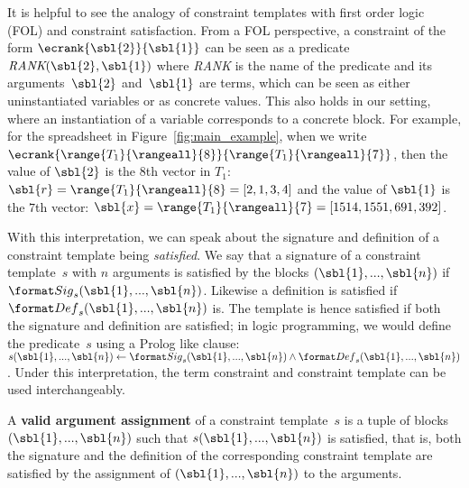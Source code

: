It is helpful to see the analogy of constraint templates with first order logic (FOL) and constraint satisfaction.
From a FOL perspective, a constraint of the form $\ecrank{\sbl{2}}{\sbl{1}}$ can be seen as a predicate $\textit{RANK}(\sbl{2}, \sbl{1})$ where \textit{RANK} is the name of the predicate and its arguments~$\sbl{2}$ and~$\sbl{1}$ are terms, which can be seen as either uninstantiated variables or as concrete values.
This also holds in our setting, where an instantiation of a variable corresponds to a concrete block.
For example, for the spreadsheet in Figure~\ref{fig:main_example}, when we write $\ecrank{\range{T_1}{\rangeall}{8}}{\range{T_1}{\rangeall}{7}}$, then the value of $\sbl{2}$ is the $8$th vector in $T_1$: $\sbl{r} = \range{T_1}{\rangeall}{8} = [2,1,3,4]$ and the value of $\sbl{1}$ is the $7$th vector: $\sbl{x} = \range{T_1}{\rangeall}{7} = [1514, 1551, 691, 392]$.


With this interpretation, we can speak about the signature and definition of a constraint template being \textit{satisfied}.
We say that a signature of a constraint template~$s$ with $n$ arguments is satisfied by the blocks $(\sbl{1}, ..., \sbl{n})$ if $\sigc(\sbl{1}, ..., \sbl{n})$. Likewise a definition is satisfied if $\defc(\sbl{1}, ..., \sbl{n})$ is.
The template is hence satisfied if both the signature and definition are satisfied; in logic programming, we would define the predicate~$s$ using a Prolog like clause: $s(\sbl{1}, ..., \sbl{n}) \leftarrow \sigc(\sbl{1}, ..., \sbl{n}) \wedge \defc(\sbl{1}, ..., \sbl{n})$.
Under this interpretation, the term constraint and constraint template can be used interchangeably.

\begin{definition}
A \textbf{valid argument assignment} of a constraint template~$s$ is a tuple of blocks $(\sbl{1}, ..., \sbl{n})$ such that $s(\sbl{1}, ..., \sbl{n})$ is satisfied, that is, both the signature and the definition of the corresponding constraint template are satisfied by the assignment of $(\sbl{1}, ..., \sbl{n})$ to the arguments.
\end{definition}


